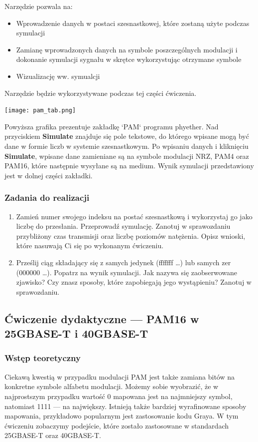 Narzędzie pozwala na:
\begin{itemize}
    \item Wprowadzenie danych w postaci szesnastkowej, które zostaną użyte podczas symulacji
    \item Zamianę wprowadzonych danych na symbole poszczególnych modulacji i dokonanie
        symulacji sygnału w skrętce wykorzystując otrzymane symbole
    \item Wizualizację ww. symualcji
\end{itemize}

Narzędzie będzie wykorzystywane podczas tej części ćwiczenia.

\texttt{[image: pam\_tab.png]}

Powyższa grafika prezentuje zakładkę `PAM` programu phyether. Nad przyciskiem \textbf{Simulate} znajduje się pole tekstowe, do którego wpisane mogą być dane w formie
liczb w systemie szesnastkowym. Po wpisaniu danych i kliknięciu \textbf{Simulate}, wpisane dane zamieniane są na symbole modulacji NRZ, PAM4 oraz PAM16, które
następnie wysyłane są na medium. Wynik symulacji przedstawiony jest w dolnej części zakładki.

\subsubsection{Zadania do realizacji}

\begin{enumerate}
    \item Zamień numer swojego indeksu na postać szesnastkową i wykorzystaj go jako liczbę do przesłania. Przeprowadź symulację. Zanotuj w sprawozdaniu
    przybliżony czas transmisji oraz liczbę poziomów natężenia. Opisz wnioski, które nasuwają Ci się po wykonanym ćwiczeniu.
    \item Prześlij ciąg składający się z samych jedynek (fffffff \dots) lub samych zer (000000 \dots). Popatrz na wynik symulacji. Jak nazywa się zaobserwowane zjawisko? Czy znasz sposoby,
    które zapobiegają jego wystąpieniu? Zanotuj w sprawozdaniu.
\end{enumerate}

\subsection{Ćwiczenie dydaktyczne --- PAM16 w 25GBASE-T i 40GBASE-T}
\subsubsection{Wstęp teoretyczny}
Ciekawą kwestią w przypadku modulacji PAM jest także zamiana bitów na konkretne symbole alfabetu modulacji.
Możemy sobie wyobrazić, że w najprostszym przypadku wartość 0 mapowana jest na najmniejszy symbol, natomiast 1111
--- na największy. Istnieją także bardziej wyrafinowane sposoby mapowania, przykładowo popularnym jest zastosowanie kodu Graya.
W tym ćwiczeniu zobaczymy podejście, które zostało zastosowane w standardach 25GBASE-T oraz 40GBASE-T.

